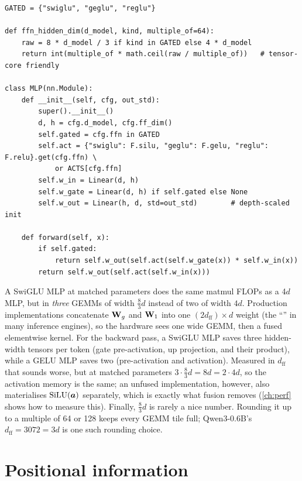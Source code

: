 \begin{lstlisting}[caption={A parameter-matched MLP family (\texttt{llmsys/ablate.py}).},label={lst:archdesign:mlp}]
GATED = {"swiglu", "geglu", "reglu"}

def ffn_hidden_dim(d_model, kind, multiple_of=64):
    raw = 8 * d_model / 3 if kind in GATED else 4 * d_model
    return int(multiple_of * math.ceil(raw / multiple_of))   # tensor-core friendly

class MLP(nn.Module):
    def __init__(self, cfg, out_std):
        super().__init__()
        d, h = cfg.d_model, cfg.ff_dim()
        self.gated = cfg.ffn in GATED
        self.act = {"swiglu": F.silu, "geglu": F.gelu, "reglu": F.relu}.get(cfg.ffn) \
            or ACTS[cfg.ffn]
        self.w_in = Linear(d, h)
        self.w_gate = Linear(d, h) if self.gated else None
        self.w_out = Linear(h, d, std=out_std)        # depth-scaled init

    def forward(self, x):
        if self.gated:
            return self.w_out(self.act(self.w_gate(x)) * self.w_in(x))
        return self.w_out(self.act(self.w_in(x)))
\end{lstlisting}

\begin{systemslens}
A SwiGLU MLP at matched parameters does the same matmul FLOPs as a 4$d$ MLP, but in \emph{three} GEMMs
of width $\frac83 d$ instead of two of width $4d$. Production implementations concatenate
$\mathbf{W}_g$ and $\mathbf{W}_1$ into one $(2d_\text{ff})\times d$ weight (the ``'' in
many inference engines), so the hardware sees one wide GEMM, then a fused
\code{silu(a) * b} elementwise kernel. For the backward pass, a SwiGLU MLP saves three hidden-width
tensors per token (gate pre-activation, up projection, and their product), while a GELU MLP saves two
(pre-activation and activation). Measured in $d_\text{ff}$ that sounds worse, but at matched parameters
$3\cdot\frac83d=8d=2\cdot4d$, so the activation memory is the same; an unfused implementation, however,
also materialises $\mathrm{SiLU}(\bm{a})$ separately, which is exactly what fusion removes
(\cref{ch:perf} shows how to measure this). Finally, $\frac83 d$ is rarely a nice number. Rounding it up to a multiple of 64 or 128 keeps every GEMM tile full; Qwen3-0.6B's
$d_\text{ff}=3072=3d$ is one such rounding choice.
\end{systemslens}

\section{Positional information}\label{sec:archdesign:pos}

